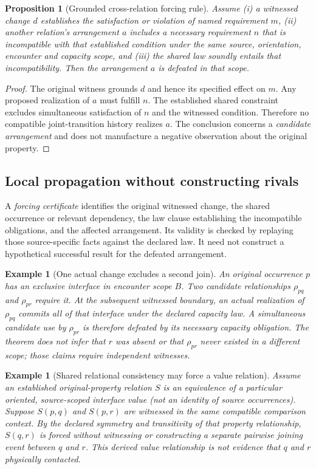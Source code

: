 \documentclass[11pt]{article}
\newtheorem{proposition}[definition]{Proposition}
\newtheorem{example}[definition]{Example}
\begin{document}
\begin{proposition}[Grounded cross-relation forcing rule]
Assume (i) a witnessed change $d$ establishes the satisfaction
or violation of named requirement $m$, (ii) another relation's
arrangement $a$ includes a necessary requirement $n$ that is
incompatible with that established condition under the same
source, orientation, encounter and capacity scope, and
(iii) the shared law soundly entails that incompatibility.
Then the arrangement $a$ is defeated in that scope.
\end{proposition}
\begin{proof}
The original witness grounds $d$ and hence its specified
effect on $m$. Any proposed realization of $a$ must
fulfill $n$. The established shared constraint excludes
simultaneous satisfaction of $n$ and the witnessed
condition. Therefore no compatible joint-transition
history realizes $a$. The conclusion concerns a
\emph{candidate arrangement} and does not manufacture a
negative observation about the original property.
\end{proof}

\subsection{Local propagation without constructing rivals}
A \emph{forcing certificate} identifies the original witnessed
change, the shared occurrence or relevant dependency, the
law clause establishing the incompatible obligations, and
the affected arrangement. Its validity is checked by
replaying those source-specific facts against the declared
law. It need not construct a hypothetical successful result
for the defeated arrangement.

\begin{example}[One actual change excludes a second join]
An original occurrence $p$ has an exclusive interface
in encounter scope $B$. Two candidate relationships
$\rho_{pq}$ and $\rho_{pr}$ require it. At the subsequent
witnessed boundary, an actual realization of $\rho_{pq}$
commits all of that interface under the declared
capacity law. A simultaneous candidate use by
$\rho_{pr}$ is therefore defeated by its necessary
capacity obligation. The theorem does \emph{not} infer
that $r$ was absent or that $\rho_{pr}$ never existed
in a different scope; those claims require independent
witnesses.
\end{example}

\begin{example}[Shared relational consistency may force a value relation]
Assume an established original-property relation $S$
is an equivalence of a particular oriented, source-scoped
interface value (not an identity of source occurrences).
Suppose $S(p,q)$ and $S(p,r)$ are witnessed in the same
compatible comparison context. By the declared symmetry
and transitivity of \emph{that} property relationship,
$S(q,r)$ is forced without witnessing or constructing
a separate pairwise joining event between $q$ and $r$.
This derived value relationship is not evidence that
$q$ and $r$ physically contacted.
\end{example}
\end{document}
